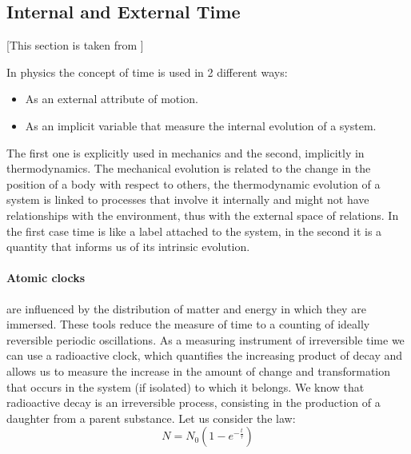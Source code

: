 \documentclass[%
 aapm,
 mph,%
 amsmath,amssymb,
 reprint,%
]{revtex4-2}
\begin{document}
\subsection{Internal and External Time}

[This  section is taken from \cite{borghi2012clock}]

In physics the concept of time is used in 2 different ways:
\begin{itemize}
    \item As an external attribute of motion.
    \item As an implicit variable that measure the internal evolution of a system.
\end{itemize}
The first one is explicitly used in mechanics and the second, implicitly in thermodynamics.  The mechanical evolution is related to the change in the position of a body with respect to others, the thermodynamic evolution of a system is linked to processes that involve it internally and might not have relationships with the environment, thus with the external space of relations. In the first case time is like a label attached to the system, in the second it is
a quantity that informs us of its intrinsic evolution.

\paragraph{Atomic clocks} are influenced by the distribution of matter and energy in which they are immersed. These tools reduce the measure of time to a counting of ideally reversible periodic oscillations. As a measuring instrument of irreversible time we can use a radioactive clock, which quantifies the increasing product of decay and allows us to measure the increase in the amount of change and transformation that occurs in the system (if isolated) to which it belongs. We know that radioactive decay is an irreversible process, consisting in the production of a daughter from a parent substance.
Let us consider the law:
\begin{equation}\label{eq:decay}
    N = N_0 \left( 1 - e^{- \frac{t}{\tau}}\right)
\end{equation}
\end{document}
